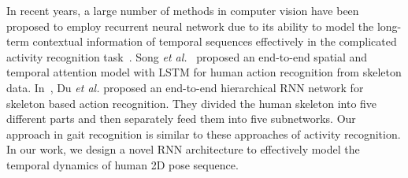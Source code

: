 In recent years, a large number of methods in computer vision have been proposed to employ recurrent neural network due to its ability to model the long-term contextual information of temporal sequences effectively in the complicated activity recognition task~\cite{Song,Du}. Song \textit{et al.}~\cite{Song} proposed an end-to-end spatial and temporal attention model with LSTM for human action recognition from skeleton data. In~\cite{Du}, Du \textit{et al.} proposed an end-to-end hierarchical RNN network for skeleton based action recognition. They divided the human skeleton into five different parts and then separately feed them into five subnetworks. Our approach in gait recognition is similar to these approaches of activity recognition. In our work, we design a novel RNN architecture to effectively model the temporal dynamics of human 2D pose sequence.
